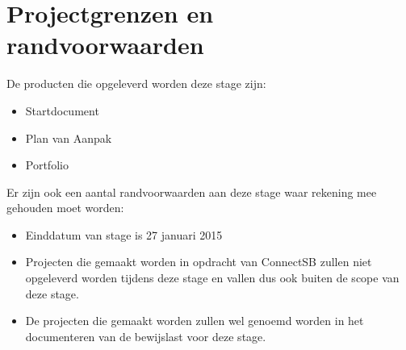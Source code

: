 
\section{Projectgrenzen en randvoorwaarden}
De producten die opgeleverd worden deze stage zijn:
\begin{itemize}
\item Startdocument
\item Plan van Aanpak
\item Portfolio
\end{itemize}

Er zijn ook een aantal randvoorwaarden aan deze stage waar rekening mee gehouden moet worden:
\begin{itemize}
\item Einddatum van stage is 27 januari 2015
\item Projecten die gemaakt worden in opdracht van ConnectSB zullen niet opgeleverd worden tijdens deze stage en vallen dus ook buiten de scope van deze stage.
\item De projecten die gemaakt worden zullen wel genoemd worden in het documenteren van de bewijslast voor deze stage.
\end{itemize}

\clearpage

